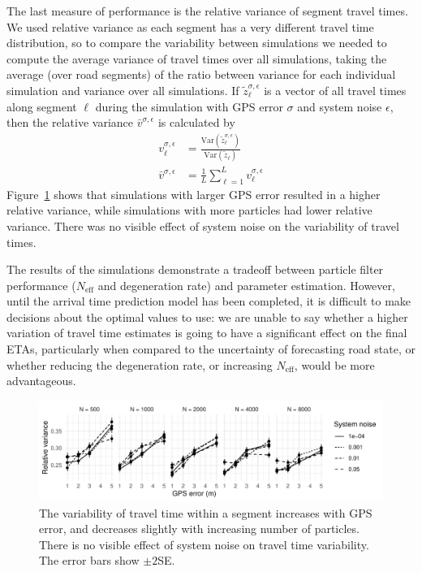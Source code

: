 The last measure of performance is the relative variance of segment travel times.
We used relative variance as each segment has a very different travel time distribution,
so to compare the variability between simulations we needed to 
compute the average variance of travel times over all simulations,
taking the average (over road segments) of the ratio between variance for
each individual simulation and variance over all simulations.
If $\tilde z_\ell^{\sigma,\epsilon}$ is a vector of all travel times
along segment $\ell$ during the simulation with GPS error $\sigma$ and system noise $\epsilon$,
then the relative variance $\bar v^{\sigma,\epsilon}$ is calculated by
\begin{equation*}
\begin{split}
v_\ell^{\sigma,\epsilon} &=
\frac{\mathrm{Var}(\tilde z_\ell^{\sigma,\epsilon})}{\mathrm{Var}(\tilde z_\ell)} \\
\bar v^{\sigma,\epsilon} &=
    \frac{1}{L}\sum_{\ell=1}^L v_\ell^{\sigma,\epsilon}
\end{split}
\end{equation*}
Figure~\ref{fig:travel_times} shows that simulations with larger GPS error
resulted in a higher relative variance,
while simulations with more particles had lower relative variance.
There was no visible effect of system noise on the variability of travel times.


The results of the simulations
demonstrate a tradeoff between particle filter performance
($N_\text{eff}$ and degeneration rate) and parameter estimation.
However, until the arrival time prediction model has been completed,
it is difficult to make decisions about the optimal values to use:
we are unable to say whether a higher variation of travel time estimates
is going to have a significant effect on the final ETAs,
particularly when compared to the uncertainty of forecasting road state,
or whether reducing the degeneration rate, 
or increasing $N_\text{eff}$, would be more advantageous.


\begin{figure}[tb]
    \centering
    \includegraphics[width=\textwidth]{figures/04_model_results_times.pdf}
    \caption{
        The variability of travel time within a segment increases with GPS error,
        and decreases slightly with increasing number of particles.
        There is no visible effect of system noise on travel time variability.
        The error bars show $\pm 2$SE.
    }
    \label{fig:travel_times}
\end{figure}


